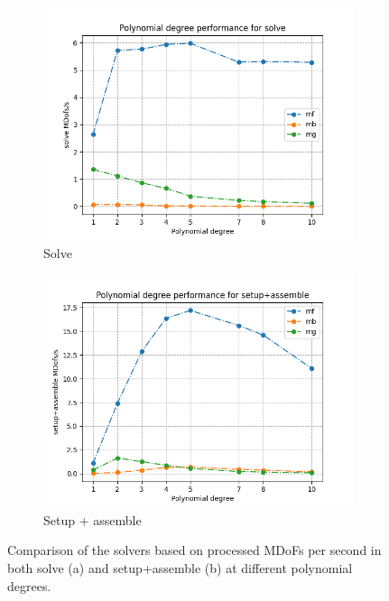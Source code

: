 \begin{figure}[h!]
     \centering
     \begin{subfigure}[h]{0.5\textwidth}
         \centering
         \includegraphics[width=\textwidth]{figure/polynomial_solve.png}
         \caption{Solve}
     \end{subfigure}
     \hspace*{-0.4cm}
     \begin{subfigure}[h]{0.5\textwidth}
         \centering
         \includegraphics[width=\textwidth]{figure/polynomial_setup+assemble.png}
         \caption{Setup + assemble}
     \end{subfigure}
     \caption{Comparison of the solvers based on processed MDoFs per second in both solve (a) and setup+assemble (b) at different polynomial degrees.}
     \label{fig:poly}
\end{figure}